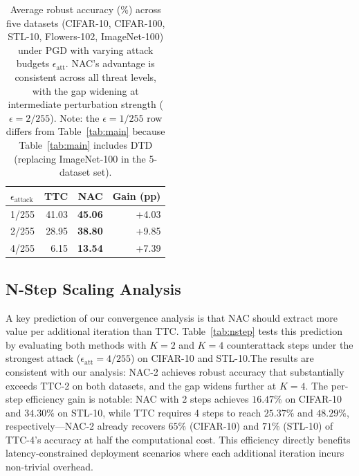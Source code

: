 \documentclass[pdflatex,sn-basic,Numbered]{sn-jnl}
\theoremstyle{thmstyleone}
\theoremstyle{thmstyletwo}
\theoremstyle{thmstylethree}
\begin{document}
\begin{table}[ht]\centering\small
\caption{Average robust accuracy (\%) across five datasets (CIFAR-10, CIFAR-100, STL-10, Flowers-102, ImageNet-100) under PGD with varying attack budgets $\epsilon_{\text{att}}$. NAC's advantage is consistent across all threat levels, with the gap widening at intermediate perturbation strength ($\epsilon=2/255$). Note: the $\epsilon{=}1/255$ row differs from Table~\ref{tab:main} because Table~\ref{tab:main} includes DTD (replacing ImageNet-100 in the 5-dataset set).}\label{tab:multi}
\begin{tabular}{@{}lrrr@{}}
\toprule $\epsilon_{\text{attack}}$ & TTC & NAC & Gain (pp) \\
\midrule 1/255 & 41.03 & \textbf{45.06} & +4.03 \\
2/255 & 28.95 & \textbf{38.80} & +9.85 \\
4/255 & 6.15 & \textbf{13.54} & +7.39 \\
\bottomrule
\end{tabular}
\end{table}

\subsection{N-Step Scaling Analysis}

A key prediction of our convergence analysis is that NAC should extract more value per additional iteration than TTC. Table~\ref{tab:nstep} tests this prediction by evaluating both methods with $K=2$ and $K=4$ counterattack steps under the strongest attack ($\epsilon_{\text{att}}=4/255$) on CIFAR-10 and STL-10.\footnotemark[1] The results are consistent with our analysis: NAC-2 achieves robust accuracy that substantially exceeds TTC-2 on both datasets, and the gap widens further at $K=4$. The per-step efficiency gain is notable: NAC with 2 steps achieves $16.47\%$ on CIFAR-10 and $34.30\%$ on STL-10, while TTC requires 4 steps to reach $25.37\%$ and $48.29\%$, respectively---NAC-2 already recovers $65\%$ (CIFAR-10) and $71\%$ (STL-10) of TTC-4's accuracy at half the computational cost. This efficiency directly benefits latency-constrained deployment scenarios where each additional iteration incurs non-trivial overhead.
\end{document}
